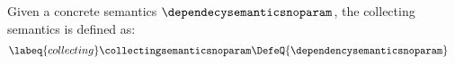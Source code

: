 \begin{definition}
  Given a concrete semantics $\dependecysemanticsnoparam$, the collecting semantics is defined as:
  \begin{align}
    \labeq{collecting}
    \collectingsemanticsnoparam &\DefeQ \{ \dependencysemanticsnoparam \}
  \end{align}
\end{definition}
